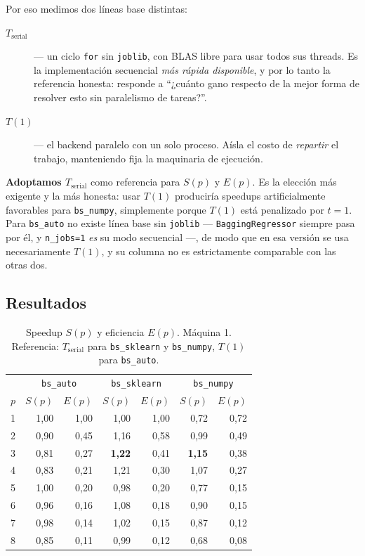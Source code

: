 \documentclass[11pt,letterpaper]{article}
\begin{document}
Por eso medimos dos líneas base distintas:

\begin{description}
\item[$T_{\text{serial}}$] --- un ciclo \texttt{for} sin \texttt{joblib}, con BLAS libre
  para usar todos sus threads. Es la implementación secuencial \emph{más rápida
  disponible}, y por lo tanto la referencia honesta: responde a ``¿cuánto gano respecto de
  la mejor forma de resolver esto sin paralelismo de tareas?''.
\item[$T(1)$] --- el backend paralelo con un solo proceso. Aísla el costo de
  \emph{repartir} el trabajo, manteniendo fija la maquinaria de ejecución.
\end{description}

\textbf{Adoptamos $T_{\text{serial}}$} como referencia para $S(p)$ y $E(p)$. Es la elección
más exigente y la más honesta: usar $T(1)$ produciría speedups artificialmente favorables
para \texttt{bs\_numpy}, simplemente porque $T(1)$ está penalizado por $t = 1$. Para
\texttt{bs\_auto} no existe línea base sin \texttt{joblib} --- \texttt{BaggingRegressor}
siempre pasa por él, y \texttt{n\_jobs=1} \emph{es} su modo secuencial ---, de modo que en
esa versión se usa necesariamente $T(1)$, y su columna no es estrictamente comparable con
las otras dos.

\subsection{Resultados}

\begin{table}[H]
\centering
\caption{Speedup $S(p)$ y eficiencia $E(p)$. Máquina 1. Referencia:
         $T_{\text{serial}}$ para \texttt{bs\_sklearn} y \texttt{bs\_numpy}, $T(1)$ para
         \texttt{bs\_auto}.}
\label{tab:speedup}
\small
\begin{tabular}{crrrrrr}
\toprule
& \multicolumn{2}{c}{\texttt{bs\_auto}} & \multicolumn{2}{c}{\texttt{bs\_sklearn}} & \multicolumn{2}{c}{\texttt{bs\_numpy}} \\
$p$ & $S(p)$ & $E(p)$ & $S(p)$ & $E(p)$ & $S(p)$ & $E(p)$ \\
\midrule
1 & 1{,}00 & 1{,}00 & 1{,}00 & 1{,}00 & 0{,}72 & 0{,}72 \\
2 & 0{,}90 & 0{,}45 & 1{,}16 & 0{,}58 & 0{,}99 & 0{,}49 \\
3 & 0{,}81 & 0{,}27 & \textbf{1{,}22} & 0{,}41 & \textbf{1{,}15} & 0{,}38 \\
4 & 0{,}83 & 0{,}21 & 1{,}21 & 0{,}30 & 1{,}07 & 0{,}27 \\
5 & 1{,}00 & 0{,}20 & 0{,}98 & 0{,}20 & 0{,}77 & 0{,}15 \\
6 & 0{,}96 & 0{,}16 & 1{,}08 & 0{,}18 & 0{,}90 & 0{,}15 \\
7 & 0{,}98 & 0{,}14 & 1{,}02 & 0{,}15 & 0{,}87 & 0{,}12 \\
8 & 0{,}85 & 0{,}11 & 0{,}99 & 0{,}12 & 0{,}68 & 0{,}08 \\
\bottomrule
\end{tabular}
\end{table}
\end{document}
